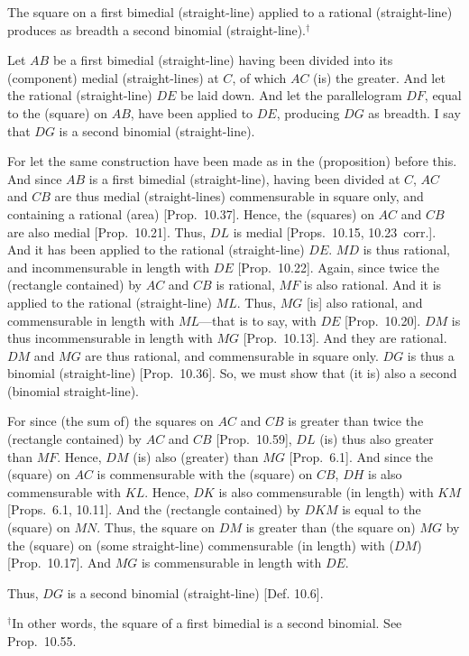 \begin{Parallel}{}{}
{The square on a first bimedial (straight-line)
applied to a rational (straight-line) produces as breadth a second binomial
(straight-line).$^\dag$

\epsfysize=1.55in
\centerline{}

Let $AB$ be a first bimedial (straight-line) having been divided into its (component)
medial (straight-lines) at $C$, of which $AC$ (is) the greater. And let
the rational (straight-line) $DE$ be laid down. And let the parallelogram
$DF$, equal to the (square) on $AB$, have been applied to $DE$, producing
$DG$ as breadth. I say that $DG$ is a second binomial (straight-line).

For let the same construction have been made as in the (proposition) before
this. And since $AB$ is a first bimedial (straight-line), having been divided at $C$, 
$AC$ and $CB$ are thus medial (straight-lines) commensurable
in square only, and containing a rational (area) [Prop.~10.37]. Hence, the (squares) on $AC$ and
$CB$ are also medial [Prop.~10.21]. Thus,
$DL$ is medial [Props.~10.15, 10.23~corr.].  And it has been applied to the
rational (straight-line) $DE$. $MD$ is thus rational, and incommensurable
in length with $DE$ [Prop.~10.22]. Again,
since twice the (rectangle contained) by $AC$ and $CB$ is rational,
$MF$ is also rational. And it is applied to the rational (straight-line)
$ML$. Thus, $MG$ [is] also rational, and commensurable in length
with $ML$---that is to say, with $DE$ [Prop.~10.20]. $DM$ is thus incommensurable in length with $MG$ [Prop.~10.13]. And they are rational. $DM$ and $MG$ are thus rational, and commensurable in square only. $DG$ is thus a binomial (straight-line) [Prop.~10.36]. So, we must show that (it
is) also a second (binomial straight-line).

For since (the sum of) the squares on $AC$ and $CB$ is greater than twice
the (rectangle contained) by $AC$ and $CB$ [Prop.~10.59], $DL$ (is) thus also greater
than $MF$. Hence, $DM$ (is) also (greater) than $MG$ [Prop.~6.1]. And since
the (square) on $AC$ is commensurable with the (square) on $CB$, $DH$
is also commensurable with $KL$. Hence, $DK$ is also commensurable
(in length) with $KM$ [Props.~6.1, 10.11].  And the (rectangle contained) by $DKM$
is equal to the (square) on $MN$. Thus, the square on $DM$ is greater
than (the square on) $MG$ by the (square) on (some straight-line)
commensurable (in length) with ($DM$) [Prop.~10.17]. And $MG$ is commensurable in length
with $DE$.

Thus, $DG$ is a second binomial (straight-line) [Def. 10.6].}
\end{Parallel}
{\footnotesize\noindent $^\dag$In other words, the square of a first bimedial is a
second binomial. See Prop.~10.55.}

